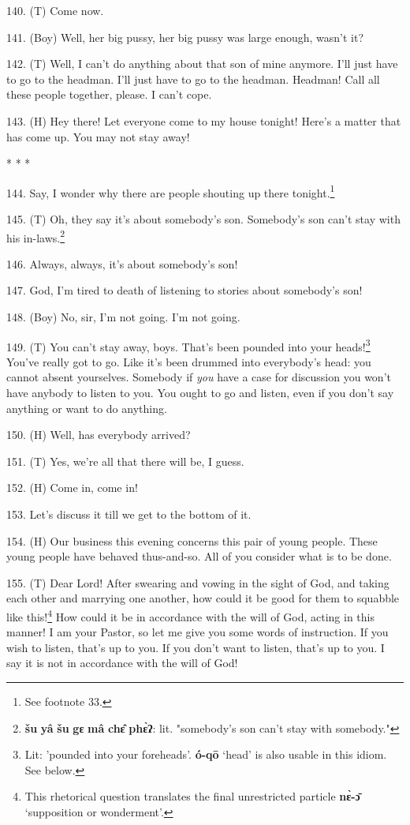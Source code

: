 
140. (T) Come now.

141. (Boy) Well, her big pussy, her big pussy was large enough, wasn't it?

142. (T) Well, I can't do anything about that son of mine anymore. I'll just have
to go to the headman. I'll just have to go to the headman. Headman! Call all these
people together, please. I can't cope.

143. (H) Hey there! Let everyone come to my house tonight! Here's a matter that
has come up. You may not stay away!

\begin{center}
* * *
\end{center}

144. Say, I wonder why there are people shouting up there tonight.\footnote{See footnote 33.}

145. (T)  Oh, they say it's
about somebody's son. Somebody's son can't stay with his in-laws.\footnote{\textbf{šu} \textbf{yâ} \textbf{šu} \textbf{gɛ} \textbf{mâ} \textbf{chɛ̂} \textbf{phɛ̀ʔ}: lit. "somebody's son can't stay with somebody."}

146. Always, always, it's about somebody's son!

147. God, I'm tired to death of listening to stories about somebody's son!

148. (Boy) No, sir, I'm not going. I'm not going.

149. (T) You can't stay away, boys. That's been pounded into your heads!\footnote{Lit: 'pounded into your foreheads'. \textbf{ó-qō} `head' is also usable in this idiom. See below.} You've
really got to go. Like it's been drummed into everybody's head: you cannot absent
yourselves. Somebody if \textit{you} have a case for discussion you won't have
anybody to listen to you. You ought to go and listen, even if you don't say anything
or want to do anything.

150. (H) Well, has everybody arrived?

151. (T) Yes, we're all that there will be, I guess.

152. (H) Come in, come in!

153. Let's discuss it till we get to the bottom of it.

154. (H) Our business this evening concerns this pair of young people. These young
people have behaved thus-and-so. All of you consider what is to be done.

155. (T)  Dear Lord! After swearing and vowing
in the sight of God, and taking each other and marrying one another, how could
it be good for them to squabble like this!\footnote{This rhetorical question translates the final unrestricted particle \textbf{nɛ̀-ɔ̄} `supposition or wonderment'.} How could it be in accordance with
the will of God, acting in this manner! I am your Pastor, so let me give you some
words of instruction. If you wish to listen, that's up to you. If you don't want
to listen, that's up to you. I say it is not in accordance with the will of God!


